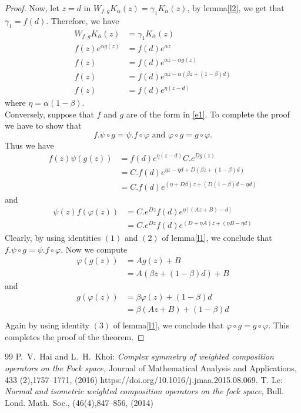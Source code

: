 \documentclass[10pt,a4paper]{amsart}
\numberwithin{equation}{section}
\begin{document}
\begin{proof}
Now, let $z=d$ in  $W_{f,g}K_{\overline{\alpha}}(z)= \gamma_{1}K_{\overline{\alpha}}(z)$, by lemma\ref{l2}, we get that $\gamma_{1}=f(d)$. Therefore, we have
\begin{align*}
    W_{f,g}K_{\overline{\alpha}}(z)&= \gamma_{1}K_{\overline{\alpha}}(z)\\
   f(z)e^{\alpha g(z)}&=f(d)e^{\alpha z} \\
   f(z)&= f(d)e^{\alpha z-\alpha g(z)}\\
   f(z)&= f(d) e^{\alpha z-\alpha(\beta z+ (1-\beta) d)}\\
   f(z)&= f(d) e^{\eta(z-d)}
\end{align*}
where $\eta = \alpha(1-\beta)$.\\
Conversely, suppose that $f$ and $g$ are of the form in \eqref{e1}. To complete the proof we have to show that 
$$f.\psi \circ g = \psi. f\circ \varphi \text{ and }\varphi \circ g= g\circ \varphi.$$
Thus we have 
\begin{align*}
 f(z)\psi (g(z)) &= f(d) e^{\eta(z-d)} C. e^{Dg(z)}\\
 &= C.f(d)e^{\eta z-\eta d+D(\beta z +(1-\beta)d)}\\
 &= C.f(d)e^{(\eta+D\beta)z+(D(1-\beta)d-\eta d)}
\end{align*}
and 
\begin{align*}
    \psi(z) f( \varphi (z))&= C. e^{Dz} f(d)e^{\eta [(Az+B)-d]}\\
    &= C. e^{Dz} f(d) e^{(D+\eta A)z+(\eta B-\eta d)}
\end{align*}
Clearly, by using identities $(1)$ and $(2)$ of lemma\ref{l1}, we conclude that $f.\psi \circ g = \psi. f\circ \varphi $. Now we compute
\begin{align*}
    \varphi( g(z))&= Ag(z)+B\\
    &= A(\beta z+ (1-\beta) d)+B
\end{align*}
and 
\begin{align*}
    g(\varphi(z))&= \beta \varphi(z)+ (1-\beta) d\\
    &= \beta (Az+B)+(1-\beta) d\\
\end{align*}
Again by using identity $(3)$ of lemma\ref{l1}, we conclude that $\varphi \circ g= g\circ \varphi.$ This completes the proof of the theorem.
\end{proof}


\begin{thebibliography}{99}
 { P.~V.~Hai and L.~H.~Khoi: }{\it Complex symmetry of weighted composition operators on the Fock space, } { Journal of Mathematical Analysis and Applications,} {433 (2)},{1757--1771}, (2016) {https://doi.org/10.1016/j.jmaa.2015.08.069}.
 { T. Le: }{\it Normal and isometric weighted composition operators on the fock space,} { Bull. Lond. Math. Soc.,} (46(4),{847--856}, (2014)
\end{thebibliography}
\end{document}
